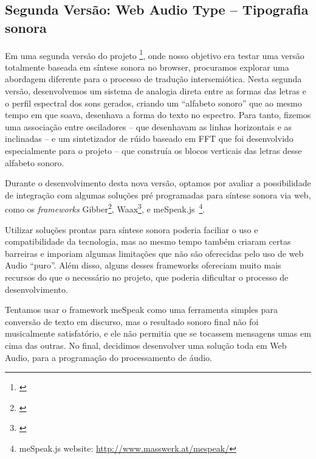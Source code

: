 \subsection{Segunda Versão: Web Audio Type -- Tipografia sonora}
Em uma segunda versão do projeto \footnote{\cite{Stolfi2017w}}, onde nosso objetivo era testar uma versão totalmente baseada em síntese sonora no browser, procuramos explorar uma abordagem diferente para o processo de tradução intersemiótica. Nesta segunda versão, desenvolvemos um sistema de analogia direta entre as formas das letras e o perfil espectral dos sons gerados, criando um ``alfabeto sonoro'' que ao mesmo tempo em que soava, desenhava a forma do texto no espectro. Para tanto, fizemos uma associação entre osciladores -- que desenhavam as linhas horizontais e as inclinadas -- e um sintetizador de rúido baseado em FFT que foi desenvolvido especialmente para o projeto -- que construía os blocos verticais das letras desse alfabeto sonoro.

Durante o desenvolvimento desta nova versão, optamos por avaliar a possibilidade de integração com algumas soluções pré programadas para síntese sonora via web, como os \emph{frameworks} Gibber\footnote{\cite{Roberts2012gibberlivecoding}}, Waax\footnote{\cite{Choi2013waax}}, e meSpeak.js~\footnote{meSpeak.js website: \url{http://www.masswerk.at/mespeak/}}. 




Utilizar soluções prontas para síntese sonora poderia faciliar o uso e compatibilidade da tecnologia, mas ao mesmo tempo também criaram certas barreiras e imporiam algumas limitações que não são oferecidas pelo uso de web Audio ``puro''. Além disso, alguns desses frameworks ofereciam muito mais recursos do que o necessário no projeto, que poderia dificultar o processo de desenvolvimento.

Tentamos usar o framework meSpeak como uma ferramenta simples para conversão de texto em discurso, mas o resultado sonoro final não foi musicalmente satisfatório, e ele não permitia que se tocassem mensagens umas em cima das outras. No final, decidimos desenvolver uma solução toda em Web Audio, para a programação do processamento de áudio.




